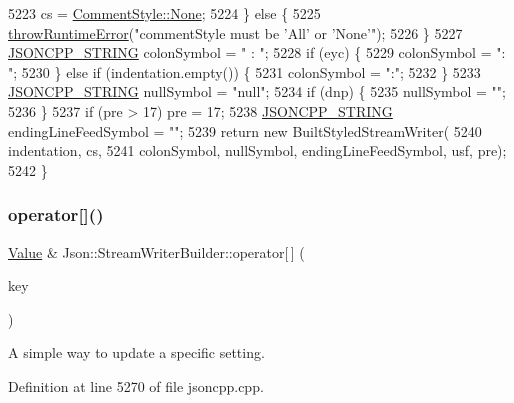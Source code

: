 \begin{DoxyCode}
5223     cs = \hyperlink{struct_json_1_1_comment_style_a51fc08f3518fd81eba12f340d19a3d0cac8b32a8bae63414c8647d4919da8d437}{CommentStyle::None};
5224   \} \textcolor{keywordflow}{else} \{
5225     \hyperlink{namespace_json_a0ab7ff7f99788262d92d9ff3d924e065}{throwRuntimeError}(\textcolor{stringliteral}{"commentStyle must be 'All' or 'None'"});
5226   \}
5227   \hyperlink{json_8h_a1e723f95759de062585bc4a8fd3fa4be}{JSONCPP\_STRING} colonSymbol = \textcolor{stringliteral}{" : "};
5228   \textcolor{keywordflow}{if} (eyc) \{
5229     colonSymbol = \textcolor{stringliteral}{": "};
5230   \} \textcolor{keywordflow}{else} \textcolor{keywordflow}{if} (indentation.empty()) \{
5231     colonSymbol = \textcolor{stringliteral}{":"};
5232   \}
5233   \hyperlink{json_8h_a1e723f95759de062585bc4a8fd3fa4be}{JSONCPP\_STRING} nullSymbol = \textcolor{stringliteral}{"null"};
5234   \textcolor{keywordflow}{if} (dnp) \{
5235     nullSymbol = \textcolor{stringliteral}{""};
5236   \}
5237   \textcolor{keywordflow}{if} (pre > 17) pre = 17;
5238   \hyperlink{json_8h_a1e723f95759de062585bc4a8fd3fa4be}{JSONCPP\_STRING} endingLineFeedSymbol = \textcolor{stringliteral}{""};
5239   \textcolor{keywordflow}{return} \textcolor{keyword}{new} BuiltStyledStreamWriter(
5240       indentation, cs,
5241       colonSymbol, nullSymbol, endingLineFeedSymbol, usf, pre);
5242 \}
\end{DoxyCode}
\mbox{\label{class_json_1_1_stream_writer_builder_af68f6b59cb20b074052ed12bb3d336a3}} 
\subsubsection{\texorpdfstring{operator[]()}{operator[]()}}
{\footnotesize\ttfamily \hyperlink{class_json_1_1_value}{Value} \& Json\+::\+Stream\+Writer\+Builder\+::operator\mbox{[}$\,$\mbox{]} (\begin{DoxyParamCaption}\item[{\hyperlink{json_8h_a1e723f95759de062585bc4a8fd3fa4be}{J\+S\+O\+N\+C\+P\+P\+\_\+\+S\+T\+R\+I\+NG}}]{key }\end{DoxyParamCaption})}

A simple way to update a specific setting. 

Definition at line 5270 of file jsoncpp.\+cpp.



